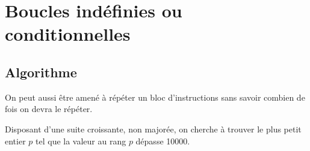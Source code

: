 %
%
%
%
%

\section{Boucles indéfinies ou conditionnelles}

\subsection{Algorithme}

On peut aussi être amené à répéter un bloc d'instructions sans savoir combien de fois on devra le 
répéter. 

Disposant d'une suite croissante, non majorée, on cherche à trouver le plus petit entier $p$ 
tel que la valeur au rang $p$ dépasse 10000.

